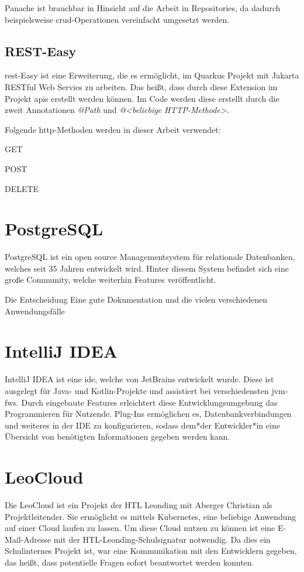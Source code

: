 Panache ist brauchbar in Hinsicht auf die Arbeit in Repositories, da dadurch beispielsweise \gls{crud}-Operationen vereinfacht umgesetzt werden. 
\cite{HibernateORMwithPanache}

\subsection{REST-Easy}
\gls{rest}-Easy ist eine Erweiterung, die es ermöglicht, im Quarkus Projekt mit Jakarta RESTful Web Servies zu arbeiten. 
Das heißt, dass durch diese Extension im Projekt \gls{api}s erstellt werden können. 
Im Code werden diese erstellt durch die zweit Annotationen \emph{@Path} und \emph{@<beliebige HTTP-Methode>}.

Folgende \gls{http}-Methoden werden in dieser Arbeit verwendet:
\begin{compactitem}
    \item GET
    \item POST 
    \item DELETE
\end{compactitem}


\section{PostgreSQL}
PostgreSQL ist ein open source Managementsystem für relationale Datenbanken, welches seit 35 Jahren entwickelt wird. 
Hinter diesem System befindet sich eine große Community, welche weiterhin Features veröffentlicht. 

Die Entscheidung  Eine gute Dokumentation und die vielen verschiedenen Anwendungsfälle 
\cite{PostgreSQLAbout}


\section{IntelliJ IDEA}
IntelliJ IDEA ist eine \gls{ide}, welche von JetBrains entwickelt wurde. 
Diese ist ausgelegt für Java- und Kotlin-Projekte und assistiert bei verschiedensten \gls{jvm}-\glspl{fw}. 
Durch eingebaute Features erleichtert diese Entwicklungsumgebung das Programmieren für Nutzende. 
Plug-Ins ermöglichen es, Datenbankverbindungen und weiteres in der IDE zu konfigurieren, sodass dem*der Entwickler*in eine Übersicht von benötigten Informationen gegeben werden kann.
\cite{IntelliJIDEA}

\section{LeoCloud}
Die LeoCloud ist ein Projekt der HTL Leonding mit Aberger Christian als Projektleitender. 
Sie ermöglicht es mittels Kubernetes, eine beliebige Anwendung auf einer Cloud laufen zu lassen. 
Um diese Cloud nutzen zu können ist eine E-Mail-Adresse mit der HTL-Leonding-Schulsignatur notwendig. 
Da dies ein Schulinternes Projekt ist, war eine Kommunikation mit den Entwicklern gegeben, das heißt, dass potentielle Fragen sofort beantwortet werden konnten. 
\cite{LeoCloudAbout}

